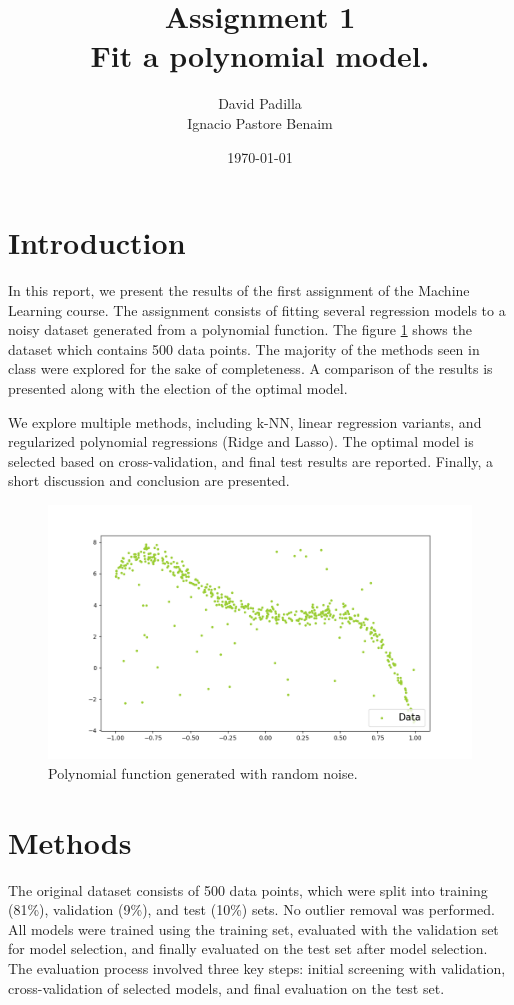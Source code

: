 \documentclass[twocolumn]{article}
\title{Assignment 1 \\ \small Fit a polynomial model.}
\author{David Padilla \\ Ignacio Pastore Benaim}
\date{\today}   %
\begin{document}
\maketitle

\section{Introduction}

In this report, we present the results of the first assignment of the Machine Learning course. The assignment consists of fitting 
several regression models to a noisy dataset generated from a polynomial function. The figure \ref{fig:polynomial_data} shows 
the dataset which contains 500 data points. The majority of the methods seen in class were explored for the sake 
of completeness. A comparison of the results is presented along with the election of the optimal model. 

We explore multiple methods, including k-NN, linear regression variants, and regularized 
polynomial regressions (Ridge and Lasso). The optimal model is selected based on cross-validation, 
and final test results are reported. Finally, a short discussion and conclusion are presented.

\begin{figure}[!htb]
\centering
\includegraphics[width=0.95\columnwidth]{images/scatter_plot.png}
\caption{Polynomial function generated with random noise.}
\label{fig:polynomial_data}
\end{figure}
  
\section{Methods}

The original dataset consists of 500 data points, which were split into training (81\%), 
validation (9\%), and test (10\%) sets. No outlier removal was performed. 
All models were trained using the training set, evaluated with the validation set for model selection, 
and finally evaluated on the test set after model selection. The evaluation process involved three key steps: 
initial screening with validation, cross-validation of selected models, and final evaluation on the test set.
\end{document}
